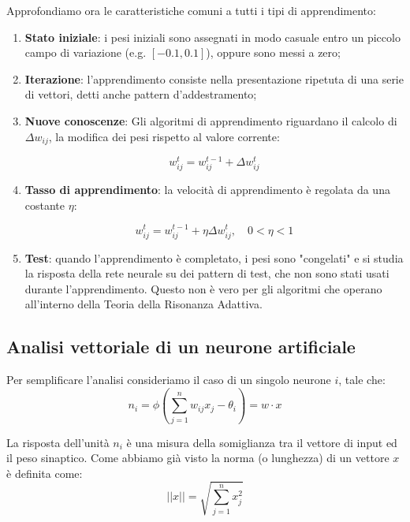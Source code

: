 Approfondiamo ora le caratteristiche comuni a tutti i tipi di apprendimento:
\begin{enumerate}
	\item \textbf{Stato iniziale}: i pesi iniziali sono assegnati in modo
	      casuale entro un piccolo campo di variazione (e.g. $[-0.1, 0.1]$),
	      oppure sono messi a zero;

	\item \textbf{Iterazione}: l'apprendimento consiste nella presentazione
	      ripetuta di una serie di vettori, detti anche pattern d'addestramento;

	\item \textbf{Nuove conoscenze}: Gli algoritmi di apprendimento
	      riguardano il calcolo di $\Delta w_{ij}$, la modifica dei pesi
	      rispetto al valore corrente:

	      \begin{equation*}
		      w_{ij}^t = w_{ij}^{t-1} + \Delta w_{ij}^{t}
	      \end{equation*}

	\item \textbf{Tasso di apprendimento}: la velocità di apprendimento è
	      regolata da una costante $\eta$:

	      \begin{equation*}
		      w_{ij}^t = w_{ij}^{t-1} + \eta \Delta w_{ij}^{t}, \quad 0 < \eta < 1
	      \end{equation*}

	\item \textbf{Test}: quando l'apprendimento è completato, i pesi sono
	      "congelati" e si studia la risposta della rete neurale su dei pattern
	      di test, che non sono stati usati durante l'apprendimento. Questo non
	      è vero per gli algoritmi che operano all'interno della Teoria della
	      Risonanza Adattiva.
\end{enumerate}

\subsection{Analisi vettoriale di un neurone artificiale}

Per semplificare l'analisi consideriamo il caso di un singolo neurone $i$, tale
che:
\begin{equation*}
	n_i = \phi(\sum_{j=1}^{n} w_{ij}x_j - \theta_i) = w \cdot x
\end{equation*}

La risposta dell'unità $n_i$ è una misura della somiglianza tra il vettore di
input ed il peso sinaptico. Come abbiamo già visto la norma (o lunghezza) di un
vettore $x$ è definita come:
\begin{equation*}
	||x|| = \sqrt{\sum_{j=1}^{n} x_j^2}
\end{equation*}

